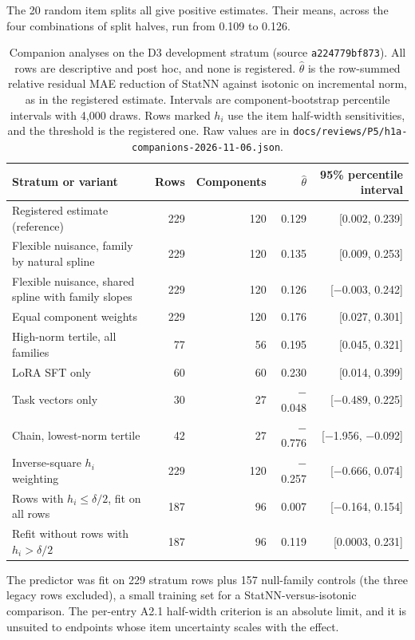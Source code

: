 The 20 random item splits all give positive estimates. Their means, across the four combinations of split halves, run from 0.109 to 0.126.
\begin{table}[t]
\centering
\small
\setlength{\tabcolsep}{4pt}
\begin{tabular}{lrrrr}\toprule
Stratum or variant & Rows & Components & $\hat\theta$ & 95\% percentile interval \\\midrule
Registered estimate (reference) & 229 & 120 & 0.129 & [0.002, 0.239] \\
Flexible nuisance, family by natural spline & 229 & 120 & 0.135 & [0.009, 0.253] \\
Flexible nuisance, shared spline with family slopes & 229 & 120 & 0.126 & [$-$0.003, 0.242] \\
Equal component weights & 229 & 120 & 0.176 & [0.027, 0.301] \\
High-norm tertile, all families & 77 & 56 & 0.195 & [0.045, 0.321] \\
LoRA SFT only & 60 & 60 & 0.230 & [0.014, 0.399] \\
Task vectors only & 30 & 27 & $-$0.048 & [$-$0.489, 0.225] \\
Chain, lowest-norm tertile & 42 & 27 & $-$0.776 & [$-$1.956, $-$0.092] \\
Inverse-square $h_i$ weighting & 229 & 120 & $-$0.257 & [$-$0.666, 0.074] \\
Rows with $h_i \le \delta/2$, fit on all rows & 187 & 96 & 0.007 & [$-$0.164, 0.154] \\
Refit without rows with $h_i > \delta/2$ & 187 & 96 & 0.119 & [0.0003, 0.231] \\\bottomrule
\end{tabular}
\caption{Companion analyses on the D3 development stratum (source \texttt{a224779bf873}). All rows are descriptive and post hoc, and none is registered. $\hat\theta$ is the row-summed relative residual MAE reduction of StatNN against isotonic on incremental norm, as in the registered estimate. Intervals are component-bootstrap percentile intervals with 4,000 draws. Rows marked $h_i$ use the item half-width sensitivities, and the threshold is the registered one. Raw values are in \texttt{docs/reviews/P5/h1a-companions-2026-11-06.json}.}
\label{tab:h1a-companions}
\end{table}

The predictor was fit on 229 stratum rows plus 157 null-family controls (the three legacy rows excluded), a small training set for a StatNN-versus-isotonic comparison. The per-entry A2.1 half-width criterion is an absolute limit, and it is unsuited to endpoints whose item uncertainty scales with the effect.

